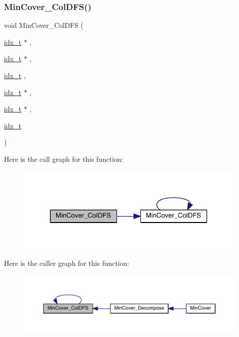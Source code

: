 \subsubsection{\texorpdfstring{Min\+Cover\+\_\+\+Col\+D\+F\+S()}{MinCover\_ColDFS()}}
{\footnotesize\ttfamily void Min\+Cover\+\_\+\+Col\+D\+FS (\begin{DoxyParamCaption}\item[{\hyperlink{a00876_aaa5262be3e700770163401acb0150f52}{idx\+\_\+t} $\ast$}]{,  }\item[{\hyperlink{a00876_aaa5262be3e700770163401acb0150f52}{idx\+\_\+t} $\ast$}]{,  }\item[{\hyperlink{a00876_aaa5262be3e700770163401acb0150f52}{idx\+\_\+t}}]{,  }\item[{\hyperlink{a00876_aaa5262be3e700770163401acb0150f52}{idx\+\_\+t} $\ast$}]{,  }\item[{\hyperlink{a00876_aaa5262be3e700770163401acb0150f52}{idx\+\_\+t} $\ast$}]{,  }\item[{\hyperlink{a00876_aaa5262be3e700770163401acb0150f52}{idx\+\_\+t}}]{ }\end{DoxyParamCaption})}

Here is the call graph for this function\+:\nopagebreak
\begin{figure}[H]
\begin{center}
\leavevmode
\includegraphics[width=316pt]{a00945_aa53562f944f7971ae3bc760f9ac41774_cgraph}
\end{center}
\end{figure}
Here is the caller graph for this function\+:\nopagebreak
\begin{figure}[H]
\begin{center}
\leavevmode
\includegraphics[width=350pt]{a00945_aa53562f944f7971ae3bc760f9ac41774_icgraph}
\end{center}
\end{figure}
\mbox{\label{a00945_adafb285aeb4295e7bbdddef0499e209c}} 
